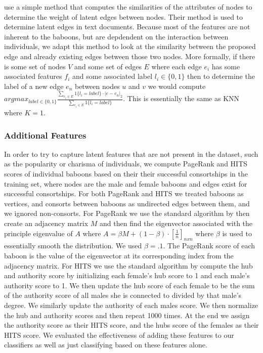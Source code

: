 \documentclass[twoside,twocolumn,paper=letter,fontsize=11pt]{article}
\begin{document}
\cite{Macskassy:2007} use a simple method that computes the similarities of the
attributes of nodes to determine the weight of latent edges between nodes. Their method is used to determine latent edges in text documents. Because most of the features are not inherent to the baboons, but are
depdendent on the interaction between individuals, we adapt this method to look
at the similarity between the proposed edge and already existing edges between
those two nodes. More formally, if there is some set of nodes $V$ and some set
of edges $E$ where each edge $e_i$ has some associated features $f_i$ and some
associated label $l_i\in \{0,1\}$ then to determine the label of a new edge
$e_n$ between nodes $u$ and $v$ we would compute $argmax_{label \in \{0,1\}}
\frac{\sum_{e_i \in E}1\{l_i=label\}\cdot|e-e_n|_2}{\sum_{e_i \in
E}1\{l_i=label\}}$. This is essentially the same as KNN where $K=1$. %

\subsubsection*{Additional Features}

In order to try to capture latent features that are not present in the dataset,
such as the popularity or charisma of individuals, we compute PageRank and HITS scores of individual baboons based on their their successful consortships in the
training set, where nodes are the male and female baboons and edges exist for
successful consortships.  For both PageRank and HITS we treated baboons as vertices, and consorts between baboons as undirected edges between them, and we ignored non-consorts. For PageRank we use the standard algorithm by \cite{Domingos:2002} then create an adjacency matrix $M$ and then find the eigenvector associated with the principle eigenvalue of $A$ where $A=\beta M+(1-\beta)\cdot[\frac{1}{n}]_{nxn}$ where $\beta$ is used to essentially smooth the distribution. We used $\beta=.1$. The PageRank score of each baboon is the value of the eigenvector at its corresponding index from the adjacency matrix. For HITS we use the standard algorithm by \cite{Kleinberg:1998} compute the hub and authority score by initializing each female's hub score to 1 and each male's authority score to 1. We then update the hub score of each female to be the sum of the authority score of all males she is connected to divided by that male's degree. We similarly update the authority of each males score. We then normalize the hub and authority scores and then repeat 1000 times. At the end we assign the authority score as their HITS score, and the hubs score of the females as their HITS score.
We evaluated the effectiveness of adding these features to our classifiers as well
as just classifying based on these features alone.
\end{document}

